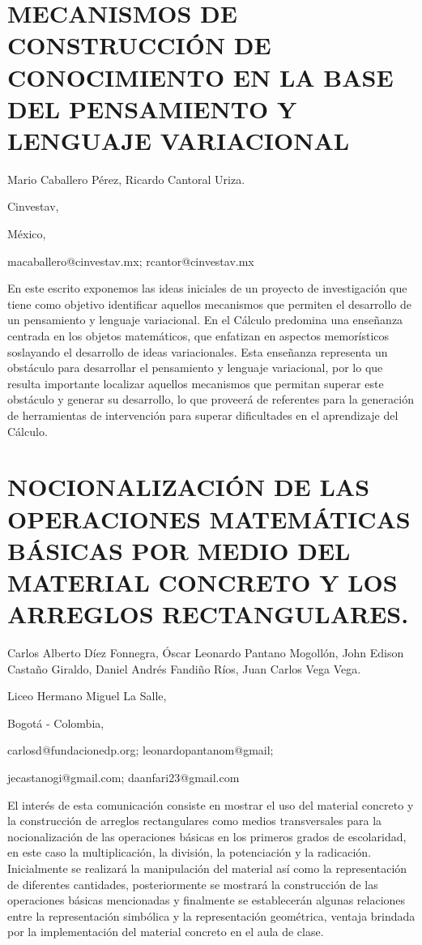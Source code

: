 \section{MECANISMOS DE CONSTRUCCIÓN DE CONOCIMIENTO EN LA BASE DEL PENSAMIENTO
Y LENGUAJE VARIACIONAL }

\begin{datos}

Mario Caballero Pérez, Ricardo Cantoral Uriza.

Cinvestav, 

México,

macaballero@cinvestav.mx; rcantor@cinvestav.mx

\end{datos}

En este escrito exponemos las ideas iniciales de un proyecto de investigación
que tiene como objetivo identificar aquellos mecanismos que permiten
el desarrollo de un pensamiento y lenguaje variacional. En el Cálculo
predomina una enseñanza centrada en los objetos matemáticos, que enfatizan
en aspectos memorísticos soslayando el desarrollo de ideas variacionales.
Esta enseñanza representa un obstáculo para desarrollar el pensamiento
y lenguaje variacional, por lo que resulta importante localizar aquellos
mecanismos que permitan superar este obstáculo y generar su desarrollo,
lo que proveerá de referentes para la generación de herramientas de
intervención para superar dificultades en el aprendizaje del Cálculo.


\section{NOCIONALIZACIÓN DE LAS OPERACIONES MATEMÁTICAS BÁSICAS POR MEDIO
DEL MATERIAL CONCRETO Y LOS ARREGLOS RECTANGULARES.}

\begin{datos}

Carlos Alberto Díez Fonnegra, Óscar Leonardo Pantano Mogollón, John
Edison Castaño Giraldo, Daniel Andrés Fandiño Ríos, Juan Carlos Vega
Vega.

Liceo Hermano Miguel La Salle,

Bogotá - Colombia,

carlosd@fundacionedp.org; leonardopantanom@gmail; 

jecastanogi@gmail.com; daanfari23@gmail.com

\end{datos}

El interés de esta comunicación consiste en mostrar el uso del material
concreto y la construcción de arreglos rectangulares como medios transversales
para la nocionalización de las operaciones básicas en los primeros
grados de escolaridad, en este caso la multiplicación, la división,
la potenciación y la radicación. Inicialmente se realizará la manipulación
del material así como la representación de diferentes cantidades,
posteriormente se mostrará la construcción de las operaciones básicas
mencionadas y finalmente se establecerán algunas relaciones entre
la representación simbólica y la representación geométrica, ventaja
brindada por la implementación del material concreto en el aula de
clase.


